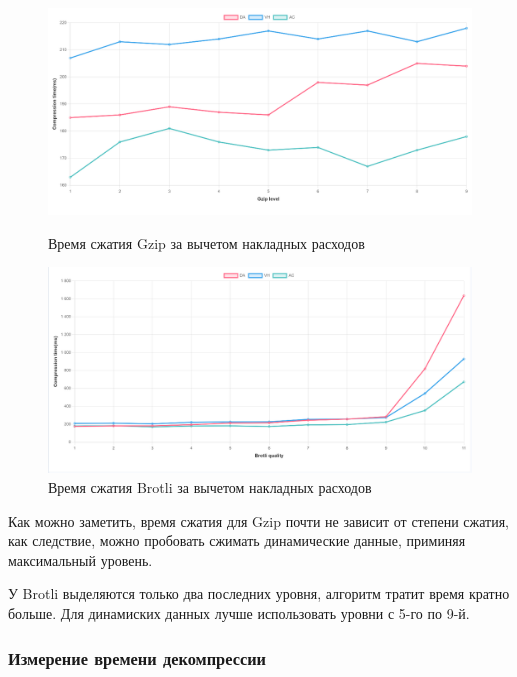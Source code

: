 \documentclass[12pt]{article}
\begin{document}
\begin{figure}[H]
    \centering
    \begin{minipage}{0.48\textwidth}
        \centering
        \includegraphics[width=\linewidth]{../images/Gzip compression time (min-overhead).png}
        \caption{Время сжатия Gzip за вычетом накладных расходов}
        \label{fig:image1}
    \end{minipage}
    \hfill
    \begin{minipage}{0.48\textwidth}
        \centering
        \includegraphics[width=\linewidth]{../images/Brotli compression time (min-overhead).png}
        \caption{Время сжатия Brotli за вычетом накладных расходов}
        \label{fig:image2}
    \end{minipage}
\end{figure}

Как можно заметить, время сжатия для Gzip почти не зависит от степени сжатия, как следствие, можно пробовать сжимать динамические данные, приминяя максимальный уровень.

У Brotli выделяются только два последних уровня, алгоритм тратит время кратно больше.
Для динамиских данных лучше использовать уровни с 5-го по 9-й.

\subsubsection{Измерение времени декомпрессии}
\end{document}
